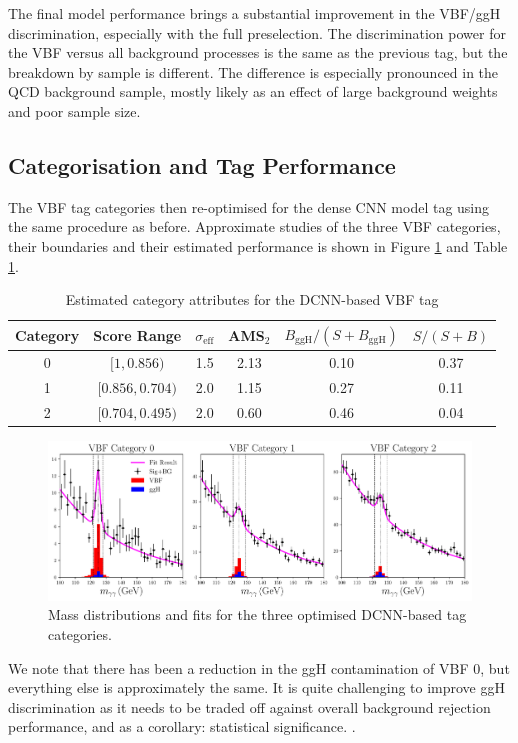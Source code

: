 The final model performance brings a substantial improvement in the VBF/ggH discrimination, especially with the full preselection. 
The discrimination power for the VBF versus all background processes is the same as the previous tag, but the breakdown by sample is different. 
The difference is especially pronounced in the QCD background sample, mostly likely as an effect of large background weights and poor sample size. 






\subsection{Categorisation and Tag Performance}
The VBF tag categories then re-optimised for the dense CNN model tag using the same procedure as before.
Approximate studies of the three VBF categories, their boundaries and their estimated performance is shown in Figure \ref{fig:event_categorisation:DCNN_mass_fits} and Table \ref{tab:event_selection:DCNN_cats}.
\begin{table}[h!]
    \begin{tabular}{ c || c | c | c | c | c }
        Category & Score Range & $\sigma_{\mathrm{eff}}$ & AMS$_2$ & $B_{\mathrm{ggH}}/(S+B_{\mathrm{ggH}})$ & $S/(S+B)$ \\
        \hline
        0 & $[1, 0.856)$     & 1.5 &  2.13 & 0.10 & 0.37 \\
        1 & $[0.856, 0.704)$ & 2.0 &  1.15  & 0.27 & 0.11 \\
        2 & $[0.704, 0.495)$ & 2.0 &  0.60 & 0.46 & 0.04 \\
\end{tabular}
    \caption{Estimated category attributes for the DCNN-based VBF tag}
    \label{tab:event_selection:DCNN_cats}
\end{table}
\begin{figure}[h!]
    \includegraphics[width=1.0\textwidth]{figures/event_selection/DCNN_mass_fits.pdf}
    \caption{Mass distributions and fits for the three optimised DCNN-based tag categories.}
    \label{fig:event_categorisation:DCNN_mass_fits}
\end{figure}
We note that there has been a reduction in the ggH contamination of VBF 0, but everything else is approximately the same. 
It is quite challenging to improve ggH discrimination as it needs to be traded off against overall background rejection performance, and as a corollary: statistical significance. . 









